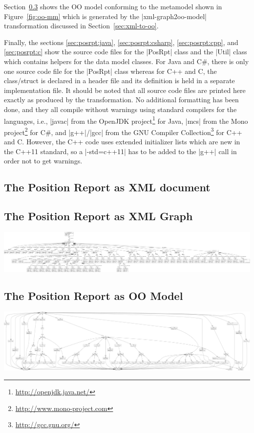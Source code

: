 \documentclass[a4paper]{article}
\newcommand{\code}{\clojureinline}
\begin{document}
Section~\ref{sec:posrpt:oo} shows the OO model conforming to the metamodel
shown in Figure~\ref{fig:oo-mm} which is generated by the
\code|xml-graph2oo-model| transformation discussed in
Section~\ref{sec:xml-to-oo}.

Finally, the sections \ref{sec:posrpt:java}, \ref{sec:posrpt:csharp},
\ref{sec:posrpt:cpp}, and \ref{sec:posrpt:c} show the source code files for the
\code|PosRpt| class and the \code|Util| class which contains helpers for the
data model classes.  For Java and C\#, there is only one source code file for
the \code|PosRpt| class whereas for C++ and C, the class/struct is declared in
a header file and its definition is held in a separate implementation file.  It
should be noted that all source code files are printed here exactly as produced
by the transformation.  No additional formatting has been done, and they all
compile without warnings using standard compilers for the languages, i.e.,
\code|javac| from the OpenJDK project\footnote{\url{http://openjdk.java.net/}}
for Java, \code|mcs| from the Mono
project\footnote{\url{http://www.mono-project.com}} for C\#, and
\code|g++|/\code|gcc| from the GNU Compiler
Collection\footnote{\url{http://gcc.gnu.org/}} for C++ and C.  However, the C++
code uses extended initializer lists which are new in the C++11 standard, so a
\code|-std=c++11| has to be added to the \code|g++| call in order not to get
warnings.


\subsection{The Position Report as XML document}
\label{sec:posrpt:xml}


\newpage
\subsection{The Position Report as XML Graph}
\label{sec:posrpt:xml-graph}
\begin{center}
  \includegraphics[angle=90,height=.95\textheight]{xml-test2}
\end{center}

\newpage
\subsection{The Position Report as OO Model}
\label{sec:posrpt:oo}
\begin{center}
  \includegraphics[angle=90,height=.95\textheight]{oo-test2}
\end{center}
\end{document}
